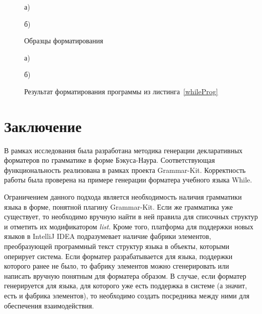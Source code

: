 \documentclass[conference]{IEEEtran}
\begin{document}
\begin{figure}[ht]
\noindent\begin{minipage}{.2\textwidth}
    
\caption*{а)}    
\end{minipage}\hfill
\begin{minipage}{.2\textwidth}
    
\caption*{б)}    
\end{minipage}
\caption{Образцы форматирования}    
\label{whileTs}
\end{figure}

\begin{figure}[ht]
\noindent\begin{minipage}{.2\textwidth}
    
\caption*{а)}    
\end{minipage}\hfill
\begin{minipage}{.2\textwidth}
    
\caption*{б)}    
\end{minipage}
\caption{Результат форматирования программы из листинга~\ref{whileProg}}
\label{whileRes}
\end{figure}

\section{Заключение}
В рамках исследования была разработана методика генерации декларативных форматеров по грамматике в форме Бэкуса-Наура.
Соответствующая функциональность реализована в рамках проекта Grammar-Kit.
Корректность работы была проверена на примере генерации форматера учебного языка While.

Ограничением данного подхода является необходимость наличия грамматики языка в форме, понятной плагину Grammar-Kit. 
Если же грамматика уже существует, то необходимо вручную найти в ней правила для списочных структур и отметить их модификатором \emph{list}.
Кроме того, платформа для поддержки новых языков в IntelliJ IDEA подразумевает наличие фабрики элементов, преобразующей программный текст структур языка в объекты, которыми оперирует система.
Если форматер разрабатывается для языка, поддержки которого ранее не было, то фабрику элементов можно сгенерировать или написать вручную понятным для форматера образом.
В случае, если форматер генерируется для языка, для которого уже есть поддержка в системе (а значит, есть и фабрика элементов), то необходимо создать посредника между ними для обеспечения взаимодействия.
\end{document}
